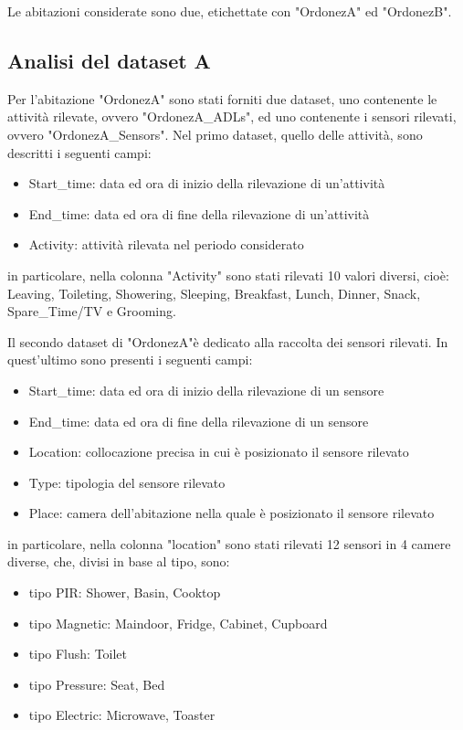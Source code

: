 \documentclass[10pt,a4paper]{article}
\begin{document}
Le abitazioni considerate sono due, etichettate con "OrdonezA" ed "OrdonezB".
\subsection{Analisi del dataset A}
Per l'abitazione "OrdonezA" sono stati forniti due dataset, uno contenente le attività rilevate, ovvero "OrdonezA\_ADLs", ed uno contenente i sensori rilevati, ovvero "OrdonezA\_Sensors".
Nel primo dataset, quello delle attività, sono descritti i seguenti campi:
\begin{itemize}
	\item Start\_time: data ed ora di inizio della rilevazione di un'attività
	\item End\_time: data ed ora di fine della rilevazione di un'attività
	\item  Activity: attività rilevata nel periodo considerato
\end{itemize}

in particolare, nella colonna "Activity" sono stati rilevati 10 valori diversi, cioè: Leaving, Toileting, Showering, Sleeping, Breakfast, Lunch, Dinner, Snack, Spare\_Time/TV e Grooming. 

Il secondo dataset di "OrdonezA"è dedicato alla raccolta dei sensori rilevati. In quest'ultimo sono presenti i seguenti campi:
\begin{itemize}
	\item Start\_time: data ed ora di inizio della rilevazione di un sensore
	\item End\_time: data ed ora di fine della rilevazione di un sensore
	\item  Location: collocazione precisa in cui è posizionato il sensore rilevato
	\item Type: tipologia del sensore rilevato
	\item Place: camera dell'abitazione nella quale è posizionato il sensore rilevato
\end{itemize}

in particolare, nella colonna "location" sono stati rilevati 12 sensori in 4 camere diverse, che, divisi in base al tipo, sono:

\begin{itemize}
	\item tipo PIR: Shower, Basin, Cooktop
	\item tipo Magnetic: Maindoor, Fridge, Cabinet, Cupboard
	\item  tipo Flush: Toilet
	\item tipo Pressure: Seat, Bed
	\item tipo Electric: Microwave, Toaster
\end{itemize}
\end{document}
